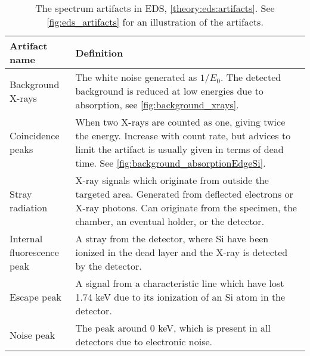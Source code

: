 \begin{table}[hbtp]
    \begin{center}
        \caption{
            The spectrum artifacts in EDS, \cref{theory:eds:artifacts}.
            See \cref{fig:eds_artifacts} for an illustration of the artifacts.
        }
        \renewcommand*{\arraystretch}{1.4}
        \label{tab:eds_artifacts}
        \begin{tabular}{p{4cm}p{10.6cm}}
            \hline
            \textbf{Artifact name}     & \textbf{Definition}                                                                                                                                                                                          \\
            \hline
            Background X-rays          & The white noise generated as $1/E_0$. The detected background is reduced at low energies due to absorption, see \cref{fig:background_xrays}.                                                      \\
            Coincidence peaks          & When two X-rays are counted as one, giving twice the energy. Increase with count rate, but advices to limit the artifact is usually given in terms of dead time. See \cref{fig:background_absorptionEdgeSi}. \\
            Stray radiation            & X-ray signals which originate from outside the targeted area. Generated from deflected electrons or X-ray photons. Can originate from the specimen, the chamber, an eventual holder, or the detector.                \\
            Internal fluorescence peak & A stray from the detector, where Si have been ionized in the dead layer and the X-ray is detected by the detector.                                                                                           \\
            Escape peak                & A signal from a characteristic line which have lost 1.74 keV due to its ionization of an Si atom in the detector.                                                                                            \\
            Noise peak                 & The peak around 0 keV, which is present in all detectors due to electronic noise.                                                                                                                            \\
            \hline
        \end{tabular}
    \end{center}
\end{table}